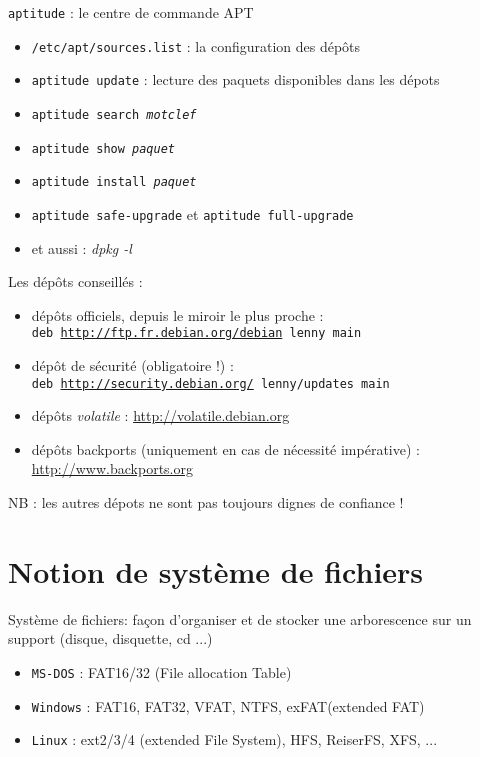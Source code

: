\documentclass[french]{beamer}
\begin{document}
\begin{frame}
\begin{center}
\texttt{aptitude} : le centre de commande APT
\end{center}
\begin{itemize}
\item \texttt{/etc/apt/sources.list} : la configuration des dépôts
\item \texttt{aptitude update} : lecture des paquets disponibles dans les dépots 
\item \texttt{aptitude search \textit{motclef}}
\item \texttt{aptitude show \textit{paquet}}
\item \texttt{aptitude install \textit{paquet}} 
\item \texttt{aptitude safe-upgrade} et  \texttt{aptitude full-upgrade}
\item et aussi : \textit{dpkg -l}
\end{itemize}
\end{frame}

\begin{frame}
Les dépôts conseillés :
\begin{itemize}
\item dépôts officiels, depuis le miroir le plus proche : \\
 \texttt{deb \url{http://ftp.fr.debian.org/debian} lenny main}
\item dépôt de sécurité (obligatoire !) : \\
 \texttt{deb \url{http://security.debian.org/} lenny/updates main}
\item dépôts \textit{volatile} : \url{http://volatile.debian.org}
\item dépôts backports (uniquement en cas de nécessité impérative) : \url{http://www.backports.org}
\end{itemize}
NB : les autres dépots ne sont pas toujours dignes de confiance !
\end{frame}



\section{Notion de système de fichiers}
\frame{\tableofcontents[current]}

\begin{frame}
\begin{center}
Système de fichiers: façon d'organiser et de stocker une arborescence sur
un support (disque, disquette, cd ...)
\end{center}
    \begin{itemize}
    \item \texttt{MS-DOS} : FAT16/32 (File allocation Table)
    \item \texttt{Windows} : FAT16, FAT32, VFAT, NTFS, exFAT(extended FAT)
    \item \texttt{Linux} : ext2/3/4 (extended File System), HFS, ReiserFS, XFS, ...
    \end{itemize}
\end{frame}
\end{document}
